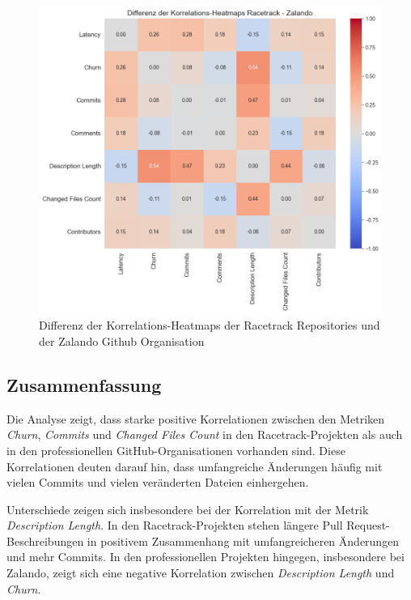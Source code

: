 \begin{figure}[htbp]
\includegraphics[width=\textwidth]{Figures/diff-korrelationsmatrix-racetrack-zalando.png}
\caption{Differenz der Korrelations-Heatmaps der Racetrack Repositories und der Zalando Github Organisation}
\label{fig:diff-korrelationsmatrix-racetrack-zalando}
\end{figure}

\newpage

\subsection{Zusammenfassung}
Die Analyse zeigt, dass starke positive Korrelationen zwischen den Metriken \textit{Churn}, \textit{Commits} und \textit{Changed Files Count} in den Racetrack-Projekten als auch in den professionellen GitHub-Organisationen vorhanden sind. Diese Korrelationen deuten darauf hin, dass umfangreiche Änderungen häufig mit vielen Commits und vielen veränderten Dateien einhergehen.

Unterschiede zeigen sich insbesondere bei der Korrelation mit der Metrik \textit{Description Length}. In den Racetrack-Projekten stehen längere Pull Request-Beschreibungen in positivem Zusammenhang mit umfangreicheren Änderungen und mehr Commits. 
In den professionellen Projekten hingegen, insbesondere bei Zalando, zeigt sich eine negative Korrelation zwischen \textit{Description Length} und \textit{Churn}. 

